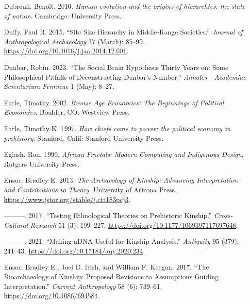 \documentclass[
  12pt,
  a4paper, twoside]{book}
\newlength{\cslhangindent}
\newlength{\cslentryspacingunit} %
\newenvironment{CSLReferences}[2] %
 {%
  \setlength{\parindent}{0pt}
  \ifodd #1
  \let\oldpar\par
  \def\par{\hangindent=\cslhangindent\oldpar}
  \fi
  \setlength{\parskip}{#2\cslentryspacingunit}
 }%
 {}
\begin{document}
\begin{CSLReferences}{1}{0}
\leavevmode{}%
Dubreuil, Benoît. 2010. \emph{Human evolution and the origins of hierarchies: the state of nature}. Cambridge: University Press.

\leavevmode{}%
Duffy, Paul R. 2015. {``Site Size Hierarchy in Middle-Range Societies.''} \emph{Journal of Anthropological Archaeology} 37 (March): 85--99. \url{https://doi.org/10.1016/j.jaa.2014.12.001}.

\leavevmode{}%
Dunbar, Robin. 2023. {``The Social Brain Hypothesis Thirty Years on: Some Philosophical Pitfalls of Deconstructing Dunbar's Number.''} \emph{Annales - Academiae Scientarium Fennicae} 1 (May): 8--27.

\leavevmode{}%
Earle, Timothy. 2002. \emph{Bronze Age Economics: The Beginnings of Political Economies}. Boulder, CO: Westview Press.

\leavevmode{}%
Earle, Timothy K. 1997. \emph{How chiefs come to power: the political economy in prehistory}. Stanford, Calif: Stanford University Press.

\leavevmode{}%
Eglash, Ron. 1999. \emph{African Fractals: Modern Computing and Indigenous Design}. Rutgers University Press.

\leavevmode{}%
Ensor, Bradley E. 2013. \emph{The Archaeology of Kinship: Advancing Interpretation and Contributions to Theory}. University of Arizona Press. \url{https://www.jstor.org/stable/j.ctt183pcj3}.

\leavevmode{}%
---------. 2017. {``Testing Ethnological Theories on Prehistoric Kinship.''} \emph{Cross-Cultural Research} 51 (3): 199--227. \url{https://doi.org/10.1177/1069397117697648}.

\leavevmode{}%
---------. 2021. {``Making aDNA Useful for Kinship Analysis.''} \emph{Antiquity} 95 (379): 241--43. \url{https://doi.org/10.15184/aqy.2020.234}.

\leavevmode{}%
Ensor, Bradley E., Joel D. Irish, and William F. Keegan. 2017. {``The Bioarchaeology of Kinship: Proposed Revisions to Assumptions Guiding Interpretation.''} \emph{Current Anthropology} 58 (6): 739--61. \url{https://doi.org/10.1086/694584}.


\end{CSLReferences}
\end{document}
